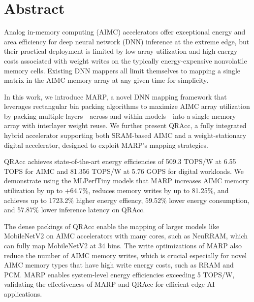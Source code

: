 \chapter*{Abstract}
    
Analog in-memory computing (AIMC) accelerators offer exceptional energy and area efficiency for deep neural network (DNN) inference at the extreme edge, but their practical deployment is limited by low array utilization and high energy costs associated with weight writes on the typically energy-expensive nonvolatile memory cells. Existing DNN mappers all limit themselves to mapping a single matrix in the AIMC memory array at any given time for simplicity. 

In this work, we introduce MARP, a novel DNN mapping framework that leverages rectangular bin packing algorithms to maximize AIMC array utilization by packing multiple layers—across and within models—into a single memory array with interlayer weight reuse. We further present QRAcc, a fully integrated hybrid accelerator supporting both SRAM-based AIMC and a weight-stationary digital accelerator, designed to exploit MARP’s mapping strategies. 

QRAcc achieves state-of-the-art energy efficiencies of 509.3 TOPS/W at 6.55 TOPS for AIMC and 81.356 TOPS/W at 5.76 GOPS for digital workloads. We demonstrate using the MLPerfTiny models that MARP increases AIMC memory utilization by up to +64.7\%, reduces memory writes by up to 81.25\%, and achieves up to 1723.2\% higher energy effiency, 59.52\% lower energy consumption, and 57.87\% lower inference latency on QRAcc. 

The dense packings of QRAcc enable the mapping of larger models like MobileNetV2 on AIMC accelerators with many cores, such as NeuRRAM, which can fully map MobileNetV2 at 34 bins. The write optimizations of MARP also reduce the number of AIMC memory writes, which is crucial especially for novel AIMC memory types that have high write energy costs, such as RRAM and PCM. 
MARP enables system-level energy efficiencies exceeding 5 TOPS/W, validating the effectiveness of MARP and QRAcc for efficient edge AI applications. 